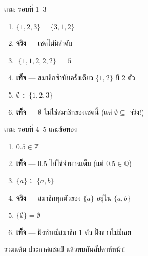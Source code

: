\begin{frame}{เกม: รอบที่ 1--3}
  \begin{enumerate}
    \item[\textbf{1.}] {\large $\{1, 2, 3\} = \{3, 1, 2\}$}
    \pause
    \item[] \hfill \textcolor{Tgreen}{\textbf{จริง}} --- เซตไม่มีลำดับ
    \pause
    \item[\textbf{2.}] {\large $|\{1, 1, 2, 2, 2\}| = 5$}
    \pause
    \item[] \hfill \textcolor{Fred}{\textbf{เท็จ}} --- สมาชิกซ้ำนับครั้งเดียว $\{1, 2\}$ มี 2 ตัว
    \pause
    \item[\textbf{3.}] {\large $\emptyset \in \{1, 2, 3\}$}
    \pause
    \item[] \hfill \textcolor{Fred}{\textbf{เท็จ}} --- $\emptyset$ ไม่ใช่สมาชิกของเซตนี้ (แต่ $\emptyset \subseteq$ จริง!)
  \end{enumerate}
\end{frame}

\begin{frame}{เกม: รอบที่ 4--5 และข้อทอง}
  \begin{enumerate}
    \item[\textbf{4.}] {\large $0.5 \in \mathbb{Z}$}
    \pause
    \item[] \hfill \textcolor{Fred}{\textbf{เท็จ}} --- $0.5$ ไม่ใช่จำนวนเต็ม (แต่ $0.5 \in \mathbb{Q}$)
    \pause
    \item[\textbf{5.}] {\large $\{a\} \subseteq \{a, b\}$}
    \pause
    \item[] \hfill \textcolor{Tgreen}{\textbf{จริง}} --- สมาชิกทุกตัวของ $\{a\}$ อยู่ใน $\{a,b\}$
    \pause
    \item[\textbf{ทอง}] {\large $\{\emptyset\} = \emptyset$} \quad {}
    \pause
    \item[] \hfill \textcolor{Fred}{\textbf{เท็จ}} --- ฝั่งซ้ายมีสมาชิก 1 ตัว ฝั่งขวาไม่มีเลย
  \end{enumerate}
  \pause
  \vspace{0.4em}
  \begin{exampleblock}{}
    \centering รวมแต้ม ประกาศแชมป์ แล้วพบกันสัปดาห์หน้า!
  \end{exampleblock}
\end{frame}


